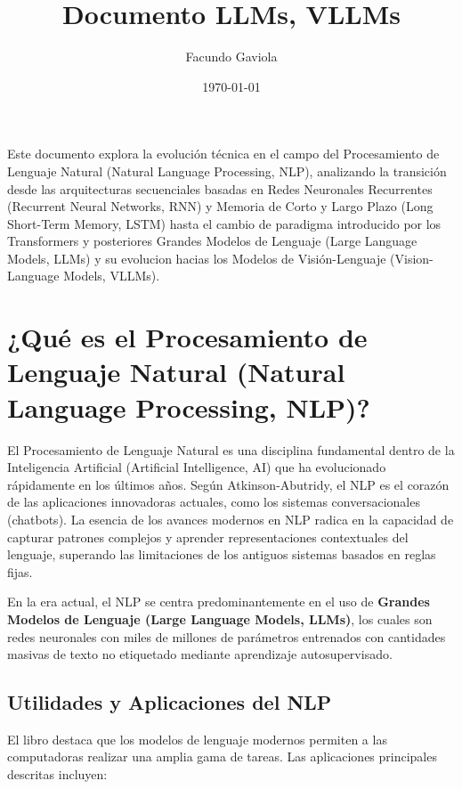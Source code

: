 \documentclass[11pt, a4paper]{article}
\title{Documento LLMs, VLLMs}
\author{Facundo Gaviola}
\date{\today}
\begin{document}
\maketitle


Este documento explora la evolución técnica en el campo del Procesamiento de Lenguaje Natural (Natural Language Processing, NLP), analizando la transición desde las 
arquitecturas secuenciales basadas en Redes Neuronales Recurrentes (Recurrent Neural Networks, RNN) y Memoria de Corto y Largo Plazo (Long Short-Term Memory, LSTM) 
hasta el cambio de paradigma introducido por los Transformers y posteriores Grandes Modelos de Lenguaje (Large Language Models, LLMs) y su evolucion hacias los Modelos 
de Visión-Lenguaje (Vision-Language Models, VLLMs).

\section{¿Qué es el Procesamiento de Lenguaje Natural (Natural Language Processing, NLP)?}

El Procesamiento de Lenguaje Natural es una disciplina fundamental dentro de la Inteligencia Artificial (Artificial Intelligence, AI) que ha evolucionado rápidamente en 
los últimos años. Según Atkinson-Abutridy, el NLP es el corazón de las aplicaciones innovadoras actuales, como los sistemas conversacionales (chatbots). La esencia de los
avances modernos en NLP radica en la capacidad de capturar patrones complejos y aprender representaciones contextuales del lenguaje, superando las limitaciones de los 
antiguos sistemas basados en reglas fijas.

En la era actual, el NLP se centra predominantemente en el uso de \textbf{Grandes Modelos de Lenguaje (Large Language Models, LLMs)}, los cuales son redes neuronales con miles
de millones de parámetros entrenados con cantidades masivas de texto no etiquetado mediante aprendizaje autosupervisado.

\subsection{Utilidades y Aplicaciones del NLP}

El libro destaca que los modelos de lenguaje modernos permiten a las computadoras realizar una amplia gama de tareas. Las aplicaciones principales descritas incluyen:
\end{document}

